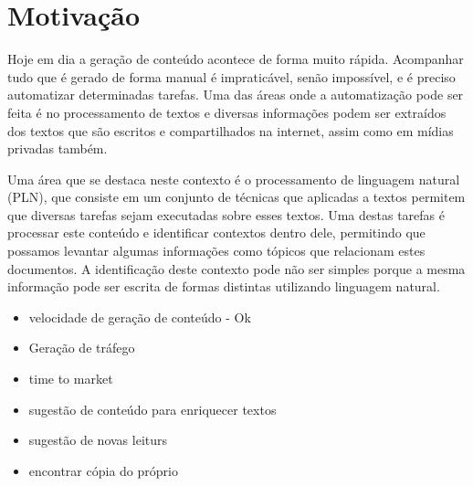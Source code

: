 \section{Motivação}

Hoje em dia a geração de conteúdo acontece de forma muito rápida. Acompanhar tudo que é gerado de forma manual é impraticável, senão impossível, e é
preciso automatizar determinadas tarefas. Uma das áreas onde a automatização pode ser feita é no processamento de textos e diversas informações podem ser 
extraídos dos textos que são escritos e compartilhados na internet, assim como em mídias privadas também.

Uma área que se destaca neste contexto é o processamento de linguagem natural (PLN), que consiste em um conjunto de técnicas que aplicadas a textos
permitem que diversas tarefas sejam executadas sobre esses textos. Uma destas tarefas é processar este conteúdo e identificar contextos dentro dele, 
permitindo que possamos levantar algumas informações como tópicos que relacionam estes documentos. A identificação deste contexto pode não ser simples
porque a mesma informação pode ser escrita de formas distintas utilizando linguagem natural.

\begin{itemize}
    \item velocidade de geração de conteúdo - Ok
    \item Geração de tráfego
    \item time to market
    \item sugestão de conteúdo para enriquecer textos
    \item sugestão de novas leiturs
    \item encontrar cópia do próprio
\end{itemize}